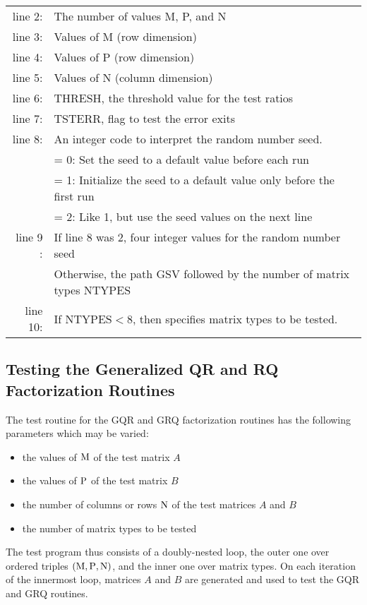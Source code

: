 \begin{tabular}{r l}
\\
line 2: &  The number of values M, P, and N \\
line 3: &  Values of M (row dimension) \\
line 4: &  Values of P (row dimension) \\
line 5: &  Values of N (column dimension) \\
line 6: &  THRESH, the threshold value for the test ratios \\
line 7: &  TSTERR, flag to test the error exits \\
line 8: &  An integer code to interpret the random number seed. \\
        &  = 0:  Set the seed to a default value before each run \\
        &  = 1:  Initialize the seed to a default value only before the
first run
 \\
        &  = 2:  Like 1, but use the seed values on the next line \\
line 9 :&  If line 8 was 2, four integer values for the random number
seed \\
        &  Otherwise, the path GSV followed by the number of matrix types NTYPES\\
line 10: &  If $\mbox{NTYPES} < 8$, then specifies matrix types to be tested.
\end{tabular}
 
\subsection{Testing the Generalized QR and RQ Factorization Routines}

\dent
The test routine for the GQR and GRQ factorization routines has the
following parameters which may be varied:
\begin{itemize}
\item   the values of ${\rm M}$ of the test matrix $A$
\item   the values of ${\rm P}$ of the test matrix $B$
\item   the number of columns or rows ${\rm N}$ of the test matrices $A$ and $B$
\item   the number of matrix types to be tested
\end{itemize}
The test program thus consists of a doubly-nested
loop, the outer one over ordered triples $({\rm M},{\rm P}, {\rm N})$,
and the inner one over matrix types.
On each iteration of the innermost loop,
matrices $A$ and $B$ are generated and used
to test the GQR and GRQ routines.

